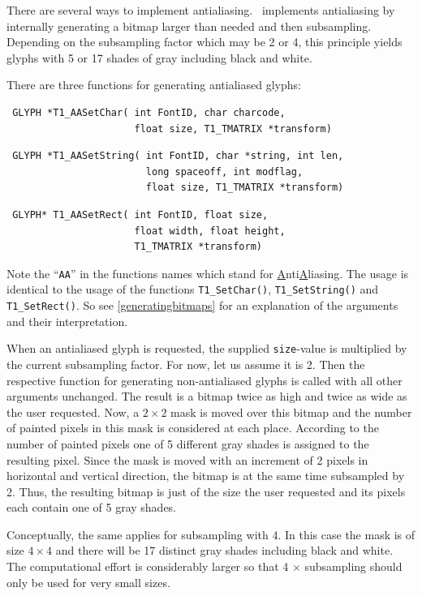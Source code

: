 There are several ways to implement antialiasing. \tonelib\ implements
antialiasing by internally generating a bitmap larger than needed
and then subsampling. Depending on the subsampling factor which may be 2 or 4,
this principle yields glyphs with
5 or 17 shades of gray including black and white. 

There are three functions for generating antialiased glyphs:
\precorr
\begin{verbatim}
 GLYPH *T1_AASetChar( int FontID, char charcode, 
                      float size, T1_TMATRIX *transform)
\end{verbatim}\postcorr
\precorr
\begin{verbatim}
 GLYPH *T1_AASetString( int FontID, char *string, int len, 
                        long spaceoff, int modflag, 
                        float size, T1_TMATRIX *transform)
\end{verbatim}\postcorr
\precorr 
\begin{verbatim}
 GLYPH* T1_AASetRect( int FontID, float size,
                      float width, float height,
                      T1_TMATRIX *transform)
\end{verbatim}\postcorr
Note the ``\verb+AA+'' in the functions names which stand for
\underline{A}nti\underline{A}liasing. The usage is identical to the usage of
the functions \verb+T1_SetChar()+, \verb+T1_SetString()+ and
\verb+T1_SetRect()+. So see \ref{generatingbitmaps} for an explanation of the
arguments and their interpretation.

When an antialiased glyph is requested, the supplied \verb+size+-value is
multiplied by the current subsampling factor. For now, let us assume it is 2.
Then the respective function for generating non-antialiased glyphs
is called with all other arguments unchanged. The result is a bitmap twice as
high and twice as wide as the user requested. Now, a $2\times2$ mask is moved
over this bitmap and the number of painted pixels in this mask is considered
at each place. According to the number of painted pixels one of 5 different
gray shades is assigned to the resulting pixel. Since the mask is moved with
an increment of 2 pixels in horizontal and vertical direction, the bitmap is
at the same time subsampled by 2. Thus, the resulting bitmap is just of the
size the user requested and its pixels each contain one of 5 gray shades. 

Conceptually, the same applies for subsampling with 4. In this case the mask is
of size $4\times4$ and there will be 17 distinct gray shades including black
and white. The computational effort is considerably larger so that 4 $\times$
subsampling should only be used for very small sizes. 

